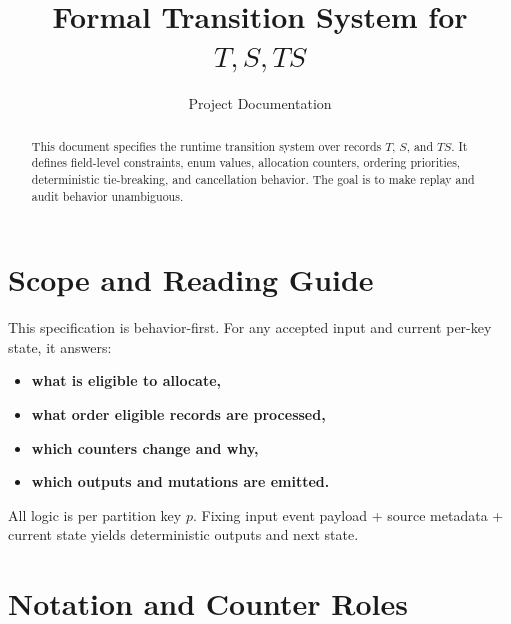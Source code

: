 \documentclass[sigconf]{acmart}
\title{Formal Transition System for \texorpdfstring{$T,S,TS$}{T,S,TS}}
\author{Project Documentation}
\date{}
\begin{document}
\begin{abstract}
This document specifies the runtime transition system over records $T$, $S$, and $TS$.
It defines field-level constraints, enum values, allocation counters, ordering priorities, deterministic tie-breaking, and cancellation behavior.
The goal is to make replay and audit behavior unambiguous.
\end{abstract}

\maketitle

\section{Scope and Reading Guide}
This specification is behavior-first.
For any accepted input and current per-key state, it answers:
\begin{itemize}[leftmargin=*]
  \item \textbf{what is eligible to allocate,}
  \item \textbf{what order eligible records are processed,}
  \item \textbf{which counters change and why,}
  \item \textbf{which outputs and mutations are emitted.}
\end{itemize}

All logic is per partition key $p$.
Fixing input event payload + source metadata + current state yields deterministic outputs and next state.

\section{Notation and Counter Roles}\label{sec:notation}
\end{document}
